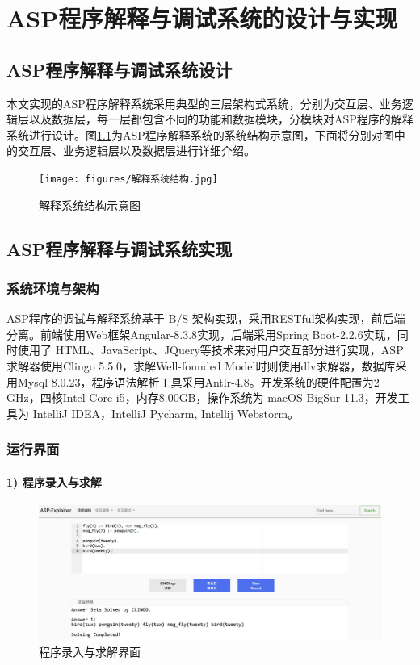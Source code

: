 \chapter{ASP程序解释与调试系统的设计与实现}
\section{ASP程序解释与调试系统设计}
本文实现的ASP程序解释系统采用典型的三层架构式系统，分别为交互层、业务逻辑层以及数据层，每一层都包含不同的功能和数据模块，分模块对ASP程序的解释系统进行设计。图\ref{fig:exp_system}为ASP程序解释系统的系统结构示意图，下面将分别对图中的交互层、业务逻辑层以及数据层进行详细介绍。
\begin{figure}[htbp]
    \centering
    \texttt{[image: figures/解释系统结构.jpg]}
    \caption{解释系统结构示意图}
    \label{fig:exp_system}
\end{figure}

\section{ASP程序解释与调试系统实现}
\subsection{系统环境与架构}
ASP程序的调试与解释系统基于 B/S 架构实现，采用RESTful架构实现，前后端分离。前端使用Web框架Angular-8.3.8实现，后端采用Spring Boot-2.2.6实现，同时使用了 HTML、JavaScript、JQuery等技术来对用户交互部分进行实现，ASP求解器使用Clingo 5.5.0，求解Well-founded Model时则使用dlv求解器，数据库采用Mysql 8.0.23，程序语法解析工具采用Antlr-4.8。开发系统的硬件配置为2 GHz，四核Intel Core i5，内存8.00GB，操作系统为 macOS BigSur 11.3，开发工具为 IntelliJ IDEA，IntelliJ Pycharm, Intellij Webstorm。
\subsection{运行界面}
\subsubsection*{1) 程序录入与求解}
\begin{figure}[htbp]
    \centering
    \includegraphics[width=0.8\linewidth]{figures/程序录入.jpg}
    \caption{程序录入与求解界面}
    \label{fig:prginput}
\end{figure}

